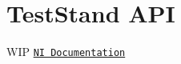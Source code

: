 \chapter{Test\+Stand API }
\hypertarget{api}{}\label{api}
WIP \href{https://www.ni.com/en/support/documentation/supplemental/08/programming-with-the-teststand-api.html?srsltid=AfmBOoqlfdJtqebNAnq4Q-6613BWmBbvTlgJdJIc0X8zPEaPJOGfshIn}{\texttt{NI Documentation}} 